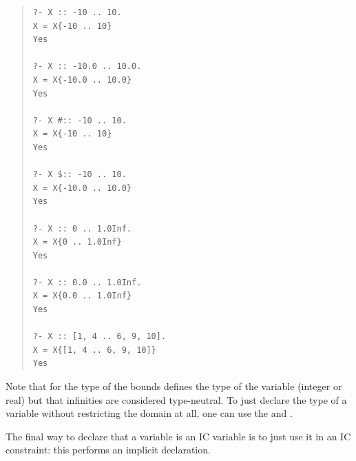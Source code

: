 \begin{quote}\begin{verbatim}
?- X :: -10 .. 10.
X = X{-10 .. 10}
Yes

?- X :: -10.0 .. 10.0.
X = X{-10.0 .. 10.0}
Yes

?- X #:: -10 .. 10.
X = X{-10 .. 10}
Yes

?- X $:: -10 .. 10.
X = X{-10.0 .. 10.0}
Yes

?- X :: 0 .. 1.0Inf.
X = X{0 .. 1.0Inf}
Yes

?- X :: 0.0 .. 1.0Inf.
X = X{0.0 .. 1.0Inf}
Yes

?- X :: [1, 4 .. 6, 9, 10].
X = X{[1, 4 .. 6, 9, 10]}
Yes
\end{verbatim}\end{quote}

Note that for 
  the type
of the bounds defines the type of the variable (integer or real) but that
infinities are considered type-neutral.  To just declare the type of a
variable without restricting the domain at all, one can use the
and  
.

The final way to declare that a variable is an IC variable is to just use it
in an IC constraint: this performs an implicit declaration.


